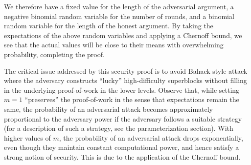 We therefore have a fixed value for the length of the adversarial argument, a
negative binomial random variable for the number of rounds, and a binomial
random variable for the length of the honest argument. By taking the
expectations of the above random variables and applying a Chernoff bound, we see
that the actual values will be close to their means with overwhelming
probability, completing the proof.
\fi

\begin{remark}
\label{rmk.variance}
The critical issue addressed by this security proof is to avoid Bahack-style
attack \cite{bahack} where the adversary constructs ``lucky'' high-difficulty
superblocks without filling in the underlying proof-of-work in the lower
levels. Observe that, while setting $m = 1$ ``preserves'' the proof-of-work in
the sense that expectations remain the same, the probability of an adversarial
attack becomes approximately proportional to the adversary power if the
adversary follows a suitable strategy (for a description of such a strategy,
see the parameterization section). With higher values of $m$, the probability of
an adversarial attack drops exponentially, even though they maintain constant
computational power, and hence satisfy a strong notion of security. This is due
to the application of the Chernoff bound.
\end{remark}
